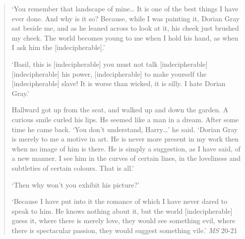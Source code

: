 \documentclass[11pt]{article}
\begin{document}
\begin{quote}
‘You remember that landscape of mine\ldots{} It is one of the best things I
have ever done. And why is it so? Because, while I was painting it,
Dorian Gray sat beside me, and as he leaned across to look at it, his
cheek just brushed my cheek. The world becomes young to me when I hold
his hand, as when I ask him the [indecipherable].’

‘Basil, this is [indecipherable] you must not talk [indecipherable]
[indecipherable] his power, [indecipherable] to make yourself the
[indecipherable] slave! It is worse than wicked, it is silly. I hate
Dorian Gray.’

Hallward got up from the seat, and walked up and down the garden. A
curious smile curled his lips. He seemed like a man in a dream. After
some time he came back. ‘You don’t understand, Harry…’ he
said. ‘Dorian Gray is merely to me a motive in art. He is never more
present in my work then when no image of him is there. He is simply a
suggestion, as I have said, of a new manner. I see him in the curves
of certain lines, in the loveliness and subtleties of certain
colours. That is all.’

‘Then why won’t you exhibit his picture?’

‘Because I have put into it the romance of which I have never dared to
speak to him. He knows nothing about it, but the world
[indecipherable] guess it, where there is merely love, they would see
something evil, where there is spectacular passion, they would suggest
something vile.' \emph{MS} 20-21
\end{quote}
\end{document}
